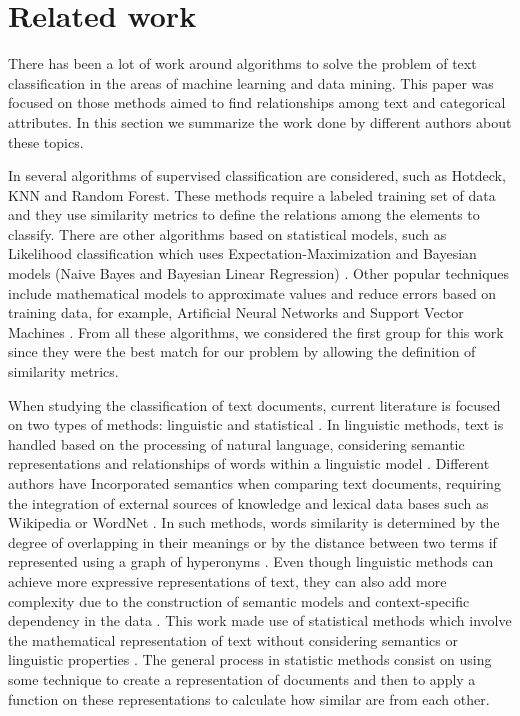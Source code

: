 \documentclass[preprint,12pt,3p]{elsarticle}
\begin{document}
\section{Related work}
\label{related_work}

There has been a lot of work around algorithms to solve the problem of text classification in the areas of machine learning and data mining. This paper was focused on those methods aimed to find relationships among text and categorical attributes. In this section we summarize the work done by different authors about these topics.\par

In \cite{tran2015multiple,truong2004learning, ishioka2014investigations} several algorithms of supervised classification are considered, such as Hotdeck, KNN and Random Forest. These methods require a labeled training set of data and they use similarity metrics to define the relations among the elements to classify. There are other algorithms based on statistical models, such as Likelihood classification which uses Expectation-Maximization \cite{anagnostopoulos2014scaling} and Bayesian models (Naive Bayes and Bayesian Linear Regression) \cite{mavai2014survey}. Other popular techniques include mathematical models to approximate values and reduce errors based on training data, for example, Artificial Neural Networks \cite{nelwamondo2007missing} and Support Vector Machines \cite{hsu2003practical}. From all these algorithms, we considered the first group for this work since they were the best match for our problem by allowing the definition of similarity metrics.\par

When studying the classification of text documents, current literature is focused on two types of methods: linguistic and statistical \cite{srivastava2009text}. In linguistic methods, text is handled based on the processing of natural language, considering semantic representations and relationships of words within a linguistic model \cite{srivastava2009text}. Different authors have Incorporated semantics when comparing text documents, requiring the integration of external sources of knowledge and lexical data bases such as Wikipedia \cite{seifzadeh2015short} or WordNet  \cite{lazar2014improving, devraj2015twitter, martinez2014analysis}. In such methods, words similarity is determined by the degree of overlapping in their meanings or by the distance between two terms if represented using a graph of hyperonyms \cite{ devraj2015twitter}. Even though linguistic methods can achieve more expressive representations of text, they can also add more complexity due to the construction of semantic models and context-specific dependency in the data \cite{srivastava2009text}. This work made use of statistical methods which involve the mathematical representation of text without considering semantics or linguistic properties \cite{srivastava2009text}. The general process in statistic methods consist on using some technique to create a representation of documents and then to apply a function on these representations to calculate how similar are from each other. \par
\end{document}
